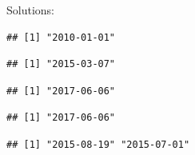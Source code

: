 \documentclass[]{book}
\newenvironment{Shaded}{\begin{snugshade}}{\end{snugshade}}
\newcommand{\CommentTok}[1]{\textcolor[rgb]{0.56,0.35,0.01}{\textit{#1}}}
\newcommand{\KeywordTok}[1]{\textcolor[rgb]{0.13,0.29,0.53}{\textbf{#1}}}
\newcommand{\NormalTok}[1]{#1}
\newcommand{\StringTok}[1]{\textcolor[rgb]{0.31,0.60,0.02}{#1}}
\theoremstyle{definition}
\theoremstyle{definition}
\theoremstyle{definition}
\theoremstyle{remark}
\begin{document}
Solutions:

\begin{Shaded}
\end{Shaded}

\begin{verbatim}
## [1] "2010-01-01"
\end{verbatim}

\begin{Shaded}
\end{Shaded}

\begin{verbatim}
## [1] "2015-03-07"
\end{verbatim}

\begin{Shaded}
\end{Shaded}

\begin{verbatim}
## [1] "2017-06-06"
\end{verbatim}

\begin{Shaded}
\end{Shaded}

\begin{verbatim}
## [1] "2017-06-06"
\end{verbatim}

\begin{Shaded}
\end{Shaded}

\begin{verbatim}
## [1] "2015-08-19" "2015-07-01"
\end{verbatim}
\end{document}
